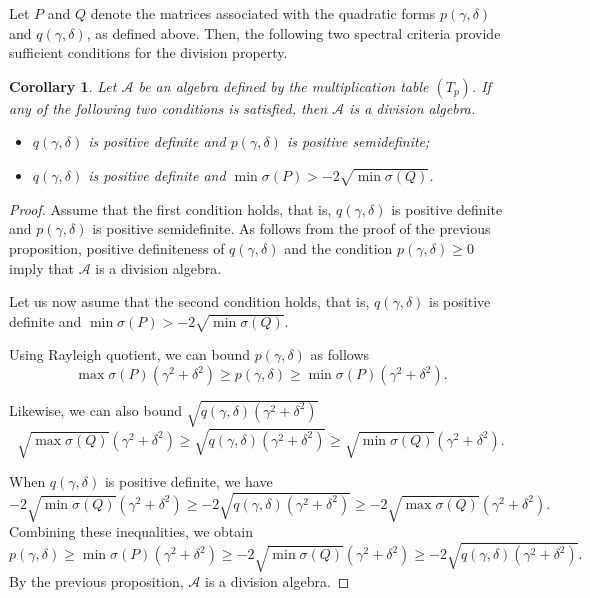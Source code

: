 \documentclass{amsart}
\theoremstyle{definition}
\theoremstyle{plain}
\newtheorem{corollary}{Corollary}
\begin{document}
Let $P$ and $Q$ denote the matrices associated with the quadratic forms $p(\gamma, \delta)$ and $q(\gamma, \delta)$, as defined above. Then, the following two spectral criteria provide sufficient conditions for the division property.
\begin{corollary}
Let $\mathcal{A}$ be an algebra defined by the multiplication table $(T_p)$. If any  of the following two conditions is satisfied, then $\mathcal{A}$ is a division algebra.
\begin{itemize}
    \item[1.] $q(\gamma,\delta)$ is positive definite and $p(\gamma,\delta)$ is positive semidefinite;
    \item[2.] $q(\gamma,\delta)$ is positive definite and $\min\sigma(P)>-2\sqrt{\min\sigma(Q)}$.
\end{itemize}
\end{corollary}
\begin{proof}

Assume that the first condition holds, that is, $q(\gamma,\delta)$ is positive definite and $p(\gamma,\delta)$ is positive semidefinite. As follows from the proof of the previous proposition, positive definiteness of  $q(\gamma,\delta)$ and the condition $p(\gamma,\delta)\geq 0$ imply that $\mathcal A$ is a division algebra.

Let us now asume that the second condition holds, that is, $q(\gamma,\delta)$ is positive definite and $\min\sigma(P)>-2\sqrt{\min\sigma(Q)}$.

Using Rayleigh quotient, we can bound $p(\gamma,\delta)$ as follows 
$$\max\sigma(P)(\gamma^2+\delta^2)\geq p(\gamma,\delta)\geq\min\sigma(P)(\gamma^2+\delta^2).$$

Likewise, we can also  bound $\sqrt{q(\gamma,\delta)(\gamma^2+\delta^2)}$ 
$$\sqrt{\max\sigma(Q)}(\gamma^2+\delta^2)\geq \sqrt{q(\gamma,\delta)(\gamma^2+\delta^2)} \geq\sqrt{\min\sigma(Q)}(\gamma^2+\delta^2).$$

When $q(\gamma,\delta)$ is positive definite, we have
$$-2\sqrt{\min\sigma(Q)}(\gamma^2+\delta^2)\geq -2\sqrt{q(\gamma,\delta)(\gamma^2+\delta^2)} \geq -2\sqrt{\max\sigma(Q)}(\gamma^2+\delta^2). $$
Combining these inequalities, we obtain 
$$ p(\gamma,\delta)\geq\min\sigma(P)(\gamma^2+\delta^2) \geq -2\sqrt{\min\sigma(Q)}(\gamma^2+\delta^2)\geq -2\sqrt{q(\gamma,\delta)(\gamma^2+\delta^2)}.$$
By the previous proposition, $\mathcal A$ is a division algebra.
\end{proof}
\end{document}
